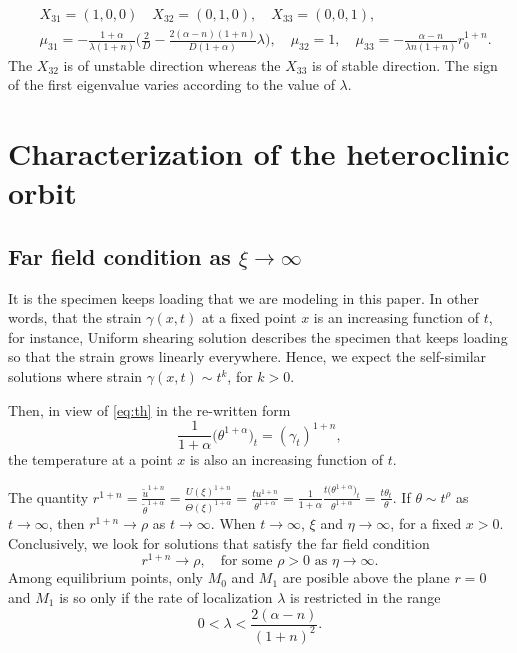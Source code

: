 \documentclass[a4paper,11pt]{article}
\def\tth{{\tilde{\theta}}}
\def\tu{{\tilde{u}}}
\begin{document}
\begin{align*}
 &X_{31} = (1,0,0) \quad X_{32}=(0,1,0), \quad X_{33}=(0,0,1),\\
 &\mu_{31} =-\frac{1+\alpha}{\lambda(1+n)} \Big(\frac{2}{D} - \frac{2(\alpha-n)(1+n)}{D(1+\alpha)}\lambda\Big), \quad \mu_{32}=1, \quad \mu_{33} = -\frac{\alpha-n}{\lambda n(1+n)}r_0^{1+n}.
\end{align*}
The $X_{32}$ is of unstable direction whereas the $X_{33}$ is of stable direction. The sign of the first eigenvalue varies according to the value of $\lambda$.

\section{Characterization of the heteroclinic orbit}

\subsection{Far field condition as $\xi \rightarrow \infty$} \label{sec:far}
It is the specimen keeps loading that we are modeling in this paper. In other words, that the strain $\gamma(x,t)$ at a fixed point $x$ is an increasing function of $t$, for instance, Uniform shearing solution describes the specimen that keeps loading so that the strain grows linearly everywhere. Hence, we expect the self-similar solutions where strain $\gamma(x,t) \sim t^k$, for $k>0$.

Then, in view of \eqref{eq:th} in the re-written form
$$ \frac{1}{1+\alpha} \big(\theta^{1+\alpha}\big)_t = (\gamma_t)^{1+n}, $$
the temperature at a point $x$ is also an increasing function of $t$.

The quantity $\displaystyle r^{1+n} = \frac{\tu^{1+n}}{\tth^{1+\alpha}} = \frac{U(\xi)^{1+n}}{\Theta(\xi)^{1+\alpha}} = \frac{tu^{1+n}}{\theta^{1+\alpha}}=\frac{1}{1+\alpha} \frac{t\big(\theta^{1+\alpha}\big)_t}{\theta^{1+\alpha}}=\frac{t\theta_t}{\theta}$. If $\theta \sim t^\rho$ as $t \rightarrow \infty$, then $r^{1+n} \rightarrow \rho$ as $t \rightarrow \infty$. When $t \rightarrow \infty$, $\xi$ and $\eta \rightarrow \infty$, for a fixed $x>0$. Conclusively, we look for solutions that satisfy the far field condition
\begin{equation}
    r^{1+n} \rightarrow \rho, \quad \text{for some $\rho>0$ as $\eta \rightarrow \infty$}. \label{eq:farcond}
\end{equation}
Among equilibrium points, only $M_0$ and $M_1$ are posible above the plane $r=0$ and $M_1$ is so only if the rate of localization $\lambda$ is restricted in the range
\begin{equation}\label{eq:r1posineq}
 0<\lambda < \frac{2(\alpha-n)}{(1+n)^2}. 
\end{equation}
\end{document}
